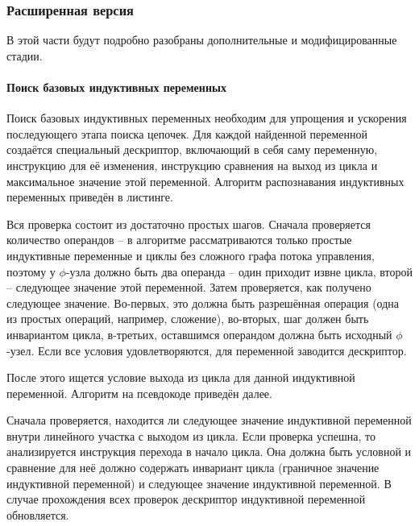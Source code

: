 \documentclass[12pt,a4paper,oneside]{article}
\begin{document}
\subsubsection{Расширенная версия}

\indent

В этой части будут подробно разобраны дополнительные и модифицированные стадии.

\paragraph{Поиск базовых индуктивных переменных}

Поиск базовых индуктивных переменных необходим для упрощения и ускорения последующего этапа поиска цепочек. Для каждой найденной переменной создаётся специальный дескриптор, включающий в себя саму переменную, инструкцию для её изменения, инструкцию сравнения на выход из цикла и максимальное значение этой переменной. Алгоритм распознавания индуктивных переменных приведён в листинге.



Вся проверка состоит из достаточно простых шагов. Сначала проверяется количество операндов -- в алгоритме рассматриваются только простые индуктивные переменные и циклы без сложного графа потока управления, поэтому у $\phi$-узла должно быть два операнда -- один приходит извне цикла, второй -- следующее значение этой переменной. Затем проверяется, как получено следующее значение. Во-первых, это должна быть разрешённая операция (одна из простых операций, например, сложение), во-вторых, шаг должен быть инвариантом цикла, в-третьих, оставшимся операндом должна быть исходный $\phi$-узел. Если все условия удовлетворяются, для переменной заводится дескриптор.

После этого ищется условие выхода из цикла для данной индуктивной переменной. Алгоритм на псевдокоде приведён далее.



Сначала проверяется, находится ли следующее значение индуктивной переменной внутри линейного участка с выходом из цикла. Если проверка успешна, то анализируется инструкция перехода в начало цикла. Она должна быть условной и сравнение для неё должно содержать инвариант цикла (граничное значение индуктивной переменной) и следующее значение индуктивной переменной. В случае прохождения всех проверок дескриптор индуктивной переменной обновляется.
\end{document}
